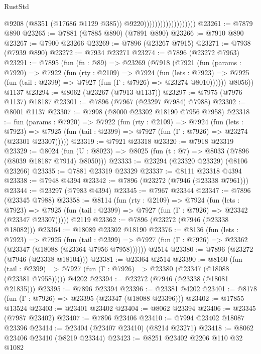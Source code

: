 \begin{lexlean}{RustStd}
\begin{coremodule}
                                          @9208
                                          (@8351 (@17686 @1129 @385))
                                          @9220)))))))))))))))))))
@23261 := @7879 @890
@23265 := @7881 (@7885 @890) (@7891 @890)
@23266 := @7910 @890
@23267 := @7900 @23266
@23269 := @7896 (@23267 @7915)
@23271 := @7938 (@7939 @890)
@23272 := @7934 @23271
@23274 := @7896 (@23272 @7963)
@23291 := @7895
    (fun (fn : @89) =>
    @23269
      (@7918
        (@7921
          (fun (params : @7920) =>
          @7922
            (fun (rty : @2109) =>
            @7924
              (fun (lets : @7923) =>
              @7925 (fun (tail : @2399) => @7927 (fun (Γ : @7926) => @23274 @8010))))))
        @8056))
    @1137
@23294 := @8062 (@23267 (@7913 @1137))
@23297 := @7975 (@7976 @1137) @18187
@23301 := @7896 (@7967 (@23297 @7984) @7988)
@23302 := @8001 @1137
@23307 := @7998 (@8000 @23302 @18190 @7956 @7958)
@23318 := fun (params : @7920) =>
  @7922
    (fun (rty : @2109) =>
    @7924
      (fun (lets : @7923) =>
      @7925 (fun (tail : @2399) => @7927 (fun (Γ : @7926) => @23274 (@23301 @23307)))))
@23319 := @7921 @23318
@23320 := @7918 @23319
@23329 := @8024
    (fun (U : @8023) => @8025 (fun (t : @7) => @8033 (@7896 (@8039 @18187 @7914) @8050)))
@23333 := @23294 (@23320 @23329) (@8106 @23266)
@23335 := @7881 @23319 @23329
@23337 := @8111 @23318 @4394
@23338 := @7948 @4394
@23342 := @7896 (@23272 (@7946 (@23338 @7961)))
@23344 := @23297 (@7983 @4394)
@23345 := @7967 @23344
@23347 := @7896 (@23345 @7988)
@23358 := @8114
    (fun (rty : @2109) =>
    @7924
      (fun (lets : @7923) =>
      @7925 (fun (tail : @2399) => @7927 (fun (Γ : @7926) => @23342 (@23347 @23307)))))
    @2119
@23362 := @7896 (@23272 (@7946 (@23338 @18082)))
@23364 := @18089 @23302 @18190
@23376 := @8136
    (fun (lets : @7923) =>
    @7925
      (fun (tail : @2399) =>
      @7927 (fun (Γ : @7926) => @23362 (@23347 (@18088 (@23364 @7956 @7958))))))
    @2514
@23380 := @7896 (@23272 (@7946 (@23338 @18104)))
@23381 := @23364 @2514
@23390 := @8160
    (fun (tail : @2399) => @7927 (fun (Γ : @7926) => @23380 (@23347 (@18088 (@23381 @7958)))))
    @4202
@23394 := @23272 (@7946 (@23338 (@18081 @21835)))
@23395 := @7896 @23394
@23396 := @23381 @4202
@23401 := @8178 (fun (Γ : @7926) => @23395 (@23347 (@18088 @23396)))
@23402 := @17855 @13524
@23403 := @23401 @23402
@23404 := @8062 @23394
@23406 := @23345 (@7987 @23402)
@23407 := @7896 @23406
@23410 := @7994 @23402 @18087 @23396
@23414 := @23404 (@23407 @23410) (@8214 @23271)
@23418 := @8062 @23406 @23410 (@8219 @23344)
@23423 := @8251 @23402 @2206 @110 @32 @1082

\end{coremodule}
\end{lexlean}
